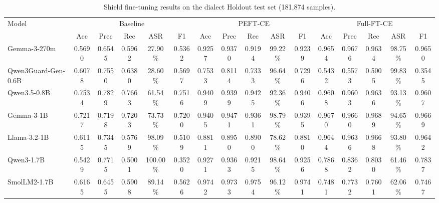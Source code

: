 \begin{table}[t]
\centering
\small
\begin{tabular}{lccccccccccccccc}
\toprule
Model & \multicolumn{5}{c}{Baseline} & \multicolumn{5}{c}{PEFT-CE} & \multicolumn{5}{c}{Full-FT-CE} \\
 & Acc & Prec & Rec & ASR & F1 & Acc & Prec & Rec & ASR & F1 & Acc & Prec & Rec & ASR & F1 \\
\midrule
Gemma-3-270m & 0.5690 & 0.6545 & 0.5962 & 27.90\% & 0.5362 & 0.9257 & 0.9370 & 0.9194 & 99.22\% & 0.9239 & 0.9654 & 0.9676 & 0.9634 & 98.75\% & 0.9650 \\
Qwen3Guard-Gen-0.6B & 0.6078 & 0.7550 & 0.6380 & 28.60\% & 0.5697 & 0.7533 & 0.8114 & 0.7333 & 96.64\% & 0.7296 & 0.5432 & 0.5573 & 0.5005 & 99.83\% & 0.3545 \\
Qwen3.5-0.8B & 0.7534 & 0.7829 & 0.7663 & 61.54\% & 0.7516 & 0.9409 & 0.9399 & 0.9425 & 92.36\% & 0.9406 & 0.9608 & 0.9603 & 0.9636 & 93.13\% & 0.9607 \\
Gemma-3-1B & 0.7217 & 0.7198 & 0.7203 & 73.73\% & 0.7200 & 0.9405 & 0.9471 & 0.9361 & 98.79\% & 0.9395 & 0.9670 & 0.9660 & 0.9689 & 94.65\% & 0.9669 \\
Llama-3.2-1B & 0.6115 & 0.7345 & 0.5769 & 98.09\% & 0.5109 & 0.8811 & 0.8950 & 0.8900 & 78.62\% & 0.8810 & 0.9644 & 0.9636 & 0.9668 & 93.80\% & 0.9642 \\
Qwen3-1.7B & 0.5429 & 0.7715 & 0.5001 & 100.00\% & 0.3520 & 0.9271 & 0.9363 & 0.9215 & 98.64\% & 0.9256 & 0.7868 & 0.8362 & 0.8030 & 61.46\% & 0.7837 \\
SmolLM2-1.7B & 0.6165 & 0.6455 & 0.5908 & 89.14\% & 0.5626 & 0.9742 & 0.9733 & 0.9754 & 96.12\% & 0.9741 & 0.7481 & 0.7732 & 0.7601 & 62.06\% & 0.7467 \\
\bottomrule
\end{tabular}
\caption{Shield fine-tuning results on the dialect Holdout test set (181{,}874 samples).}
\label{tab:shield_holdout}
\end{table}